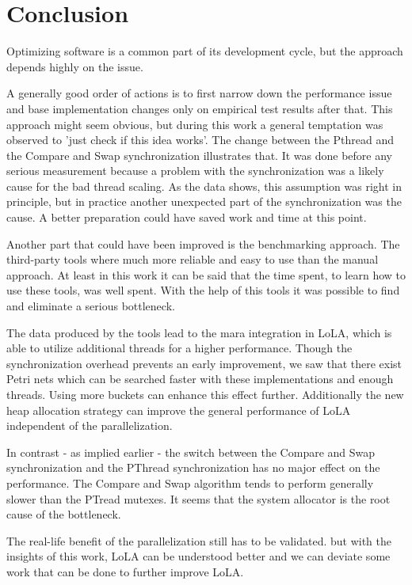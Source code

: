 \chapter{Conclusion}
Optimizing software is a common part of its development cycle, but the approach depends highly on the issue.

A generally good order of actions is to first narrow down the performance issue and base implementation changes only on empirical test results after that. This approach might seem obvious, but during this work a general temptation was observed to 'just check if this idea works'. The change between the Pthread and the Compare and Swap synchronization illustrates that. It was done before any serious measurement because a problem with the synchronization was a likely cause for the bad thread scaling. As the data shows, this assumption was right in principle, but in practice another unexpected part of the synchronization was the cause. A better preparation could have saved work and time at this point.

Another part that could have been improved is the benchmarking approach. The third-party tools where much more reliable and easy to use than the manual approach. At least in this work it can be said that the time spent, to learn how to use these tools, was well spent. With the help of this tools it was possible to find and eliminate a serious bottleneck.

The data produced by the tools lead to the mara integration in LoLA, which is able to utilize additional threads for a higher performance. Though the synchronization overhead prevents an early improvement, we saw that there exist Petri nets which can be searched faster with these implementations and enough threads. Using more buckets can enhance this effect further. Additionally the new heap allocation strategy can improve the general performance of LoLA independent of the parallelization.

In contrast - as implied earlier - the switch between the Compare and Swap synchronization and the PThread synchronization has no major effect on the performance. The Compare and Swap algorithm tends to perform generally slower than the PTread mutexes. It seems that the system allocator is the root cause of the bottleneck.

The real-life benefit of the parallelization still has to be validated. but with the insights of this work, LoLA can be understood better and we can deviate some work that can be done to further improve LoLA. 